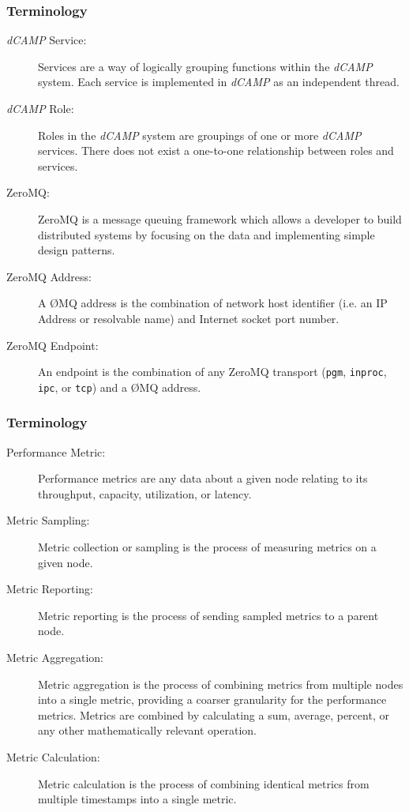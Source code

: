\documentclass{beamer}
\newcommand{\dcamp}{\emph{dCAMP }}
\begin{document}
\begin{frame}
\frametitle{Terminology}
\begin{description}

\item[\dcamp Service:]
Services are a way of logically grouping functions within the \dcamp system. Each service is implemented in \dcamp as an
independent thread.

\item[\dcamp Role:]
Roles in the \dcamp system are groupings of one or more \dcamp services. There does not exist a one-to-one
relationship between roles and services.

\item[ZeroMQ:]
ZeroMQ is a message queuing framework which allows a developer to build distributed systems by focusing on the data
and implementing simple design patterns.

\item[ZeroMQ Address:]
A \O MQ address is the combination of network host identifier (i.e. an IP Address or resolvable name) and Internet
socket port number. 

\item[ZeroMQ Endpoint:]
An endpoint is the combination of any ZeroMQ transport (\texttt{pgm}, \texttt{inproc}, \texttt{ipc}, or \texttt{tcp})
and a \O MQ address.

\end{description}
\end{frame}

\begin{frame}
\frametitle{Terminology}
\begin{description}

\item[Performance Metric:]
Performance metrics are any data about a given node relating to its throughput, capacity, utilization, or latency.

\item[Metric Sampling:]
Metric collection or sampling is the process of measuring metrics on a given node. 

\item[Metric Reporting:]
Metric reporting is the process of sending sampled metrics to a parent node.

\item[Metric Aggregation:]
Metric aggregation is the process of combining metrics from multiple nodes into a single metric, providing a coarser
granularity for the performance metrics. Metrics are combined by calculating a sum, average, percent, or any other
mathematically relevant operation.

\item[Metric Calculation:]
Metric calculation is the process of combining identical metrics from multiple timestamps into a single metric.

\end{description}
\end{frame}
\end{document}
